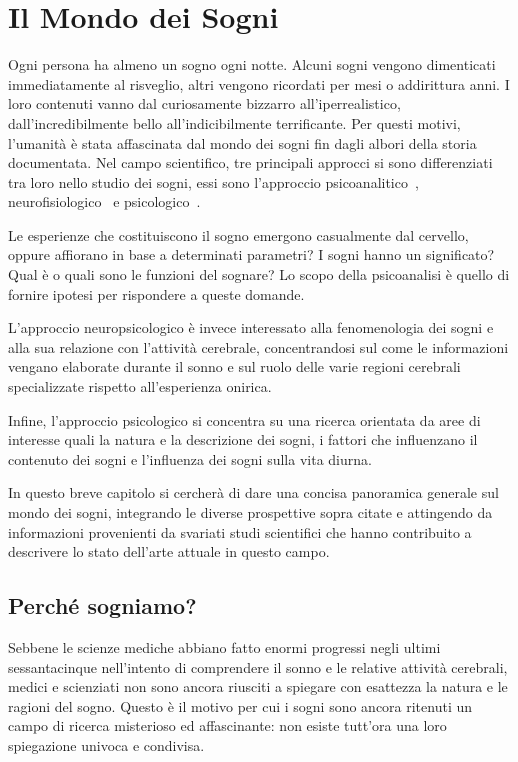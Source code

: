 \chapter{Il Mondo dei Sogni} \label{cap:mondo-dei-sogni}

Ogni persona ha almeno un sogno ogni notte.
Alcuni sogni vengono dimenticati immediatamente al risveglio, altri vengono ricordati per mesi o addirittura anni.
I loro contenuti vanno dal curiosamente bizzarro all'iperrealistico, dall'incredibilmente bello all'indicibilmente
terrificante.
Per questi motivi, l'umanità è stata affascinata dal mondo dei sogni fin dagli albori della storia documentata.
Nel campo scientifico, tre principali approcci si sono differenziati tra loro nello studio dei sogni, essi sono
l'approccio psicoanalitico~\cite{Ruby2011ExperimentalRO}, neurofisiologico~\cite{Akhtar2022} e psicologico~\cite{Schredl2005}.

Le esperienze che costituiscono il sogno emergono casualmente dal cervello, oppure affiorano in base a determinati
parametri?
I sogni hanno un significato?
Qual è o quali sono le funzioni del sognare?
Lo scopo della psicoanalisi è quello di fornire ipotesi per rispondere a queste domande.

L'approccio neuropsicologico è invece interessato alla fenomenologia dei sogni e alla sua relazione con l'attività
cerebrale, concentrandosi sul come le informazioni vengano elaborate durante il sonno e sul ruolo delle varie regioni
cerebrali specializzate rispetto all'esperienza onirica.

Infine, l'approccio psicologico si concentra su una ricerca orientata da aree di interesse quali
la natura e la descrizione dei sogni, i fattori che influenzano il contenuto dei sogni e l'influenza dei sogni sulla
vita diurna.

In questo breve capitolo si cercherà di dare una concisa panoramica generale sul mondo dei sogni, integrando le diverse
prospettive sopra citate e attingendo da informazioni provenienti da svariati studi scientifici che hanno contribuito
a descrivere lo stato dell'arte attuale in questo campo.


\section{Perché sogniamo?}
Sebbene le scienze mediche abbiano fatto enormi progressi negli ultimi sessantacinque nell'intento di comprendere il
sonno e le relative attività cerebrali, medici e scienziati non sono ancora riusciti a spiegare con esattezza la
natura e le ragioni del sogno.
Questo è il motivo per cui i sogni sono ancora ritenuti un campo di ricerca misterioso ed affascinante: non esiste
tutt'ora una loro spiegazione univoca e condivisa.

